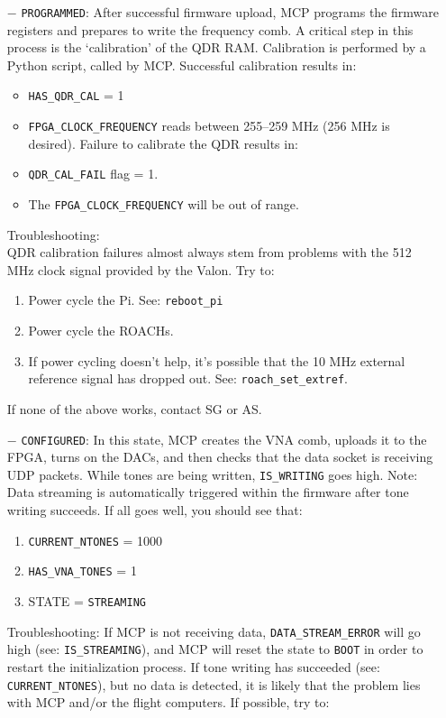 \begin{itemize}[leftmargin=*,label={}]
\begin{itemize}
\item[$-$] \texttt{PROGRAMMED}: After successful firmware upload, MCP programs the firmware registers and prepares to write the frequency comb. A critical step in this process is the ‘calibration’ of the QDR RAM. Calibration is performed by a Python script, called by MCP. Successful calibration results in:
\begin{itemize}
  \item \texttt{HAS\_QDR\_CAL} = 1
  \item \texttt{FPGA\_CLOCK\_FREQUENCY} reads between 255--259 MHz (256 MHz is desired).
  Failure to calibrate the QDR results in:
  \item \texttt{QDR\_CAL\_FAIL} flag = 1.
  \item The \texttt{FPGA\_CLOCK\_FREQUENCY} will be out of range.
\end{itemize}
Troubleshooting:\\
QDR calibration failures almost always stem from problems with the 512 MHz clock signal provided by the Valon. Try to:
\begin{enumerate}
  \item Power cycle the Pi. See: \texttt{reboot\_pi}
  \item Power cycle the ROACHs.
  \item If power cycling doesn’t help, it’s possible that the 10 MHz external reference signal has dropped out. See: \texttt{roach\_set\_extref}.
\end{enumerate}
If none of the above works, contact SG or AS.

\item[$-$] \texttt{CONFIGURED}: In this state, MCP creates the VNA comb, uploads it to the FPGA, turns on the DACs, and then checks that the data socket is receiving UDP packets. While tones are being written, \texttt{IS\_WRITING} goes high. Note: Data streaming is automatically triggered within the firmware after tone writing succeeds. If all goes well, you should see that:
\begin{enumerate}
  \item \texttt{CURRENT\_NTONES} = 1000
  \item \texttt{HAS\_VNA\_TONES} = 1
  \item STATE = \texttt{STREAMING}
\end{enumerate}
Troubleshooting:
If MCP is not receiving data, \texttt{DATA\_STREAM\_ERROR} will go high (see: \texttt{IS\_STREAMING}), and MCP will reset the state to \texttt{BOOT} in order to restart the initialization process. If tone writing has succeeded (see: \texttt{CURRENT\_NTONES}), but no data is detected, it is likely that the problem lies with MCP and/or the flight computers. If possible, try to:


\end{itemize}
\end{itemize}
